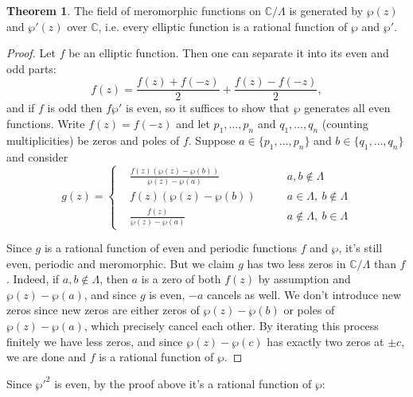 \documentclass{article}
\newcommand{\C}{\mathbb{C}}
\theoremstyle{definition}
\newtheorem{thm}[defn]{Theorem}
\begin{document}
\begin{thm}
The field of meromorphic functions on $\C/\Lambda$ is generated by $\wp(z)$ and $\wp'(z)$ over $\C$, i.e. every elliptic function is a rational function of $\wp$ and $\wp'$.
\end{thm}
\begin{proof}
Let $f$ be an elliptic function. Then one can separate it into its even and odd parts:
\[
f(z)=\frac{f(z)+f(-z)}{2}+\frac{f(z)-f(-z)}{2},
\]
and if $f$ is odd then $f\wp'$ is even, so it suffices to show that $\wp$ generates all even functions. Write $f(z)=f(-z)$ and let $p_1,\ldots,p_n$ and $q_1,\ldots,q_n$ (counting multiplicities) be zeros and poles of $f$. Suppose $a\in\{p_1,\ldots,p_n\}$ and $b\in\{q_1,\ldots,q_n\}$ and consider
\[
g(z)=\left\{\begin{aligned}
&\frac{f(z)(\wp(z)-\wp(b))}{\wp(z)-\wp(a)}\qquad &a,b\notin\Lambda \\
&f(z)(\wp(z)-\wp(b))\qquad &a\in\Lambda,\ b\notin\Lambda \\
&\frac{f(z)}{\wp(z)-\wp(a)}\qquad &a\notin\Lambda,\ b\in\Lambda
\end{aligned} \right.
\]

Since $g$ is a rational function of even and periodic functions $f$ and $\wp$, it's still even, periodic and meromorphic. But we claim $g$ has two less zeros in $\C/\Lambda$ than $f$. Indeed, if $a,b\notin\Lambda$, then $a$ is a zero of both $f(z)$ by assumption and $\wp(z)-\wp(a)$, and since $g$ is even, $-a$ cancels as well. We don't introduce new zeros since new zeros are either zeros of $\wp(z)-\wp(b)$ or poles of $\wp(z)-\wp(a)$, which precisely cancel each other. By iterating this process finitely we have less zeros, and since $\wp(z)-\wp(c)$ has exactly two zeros at $\pm c$, we are done and $f$ is a rational function of $\wp$.
\end{proof}

Since $\wp'^2$ is even, by the proof above it's a rational function of $\wp$:
\end{document}
